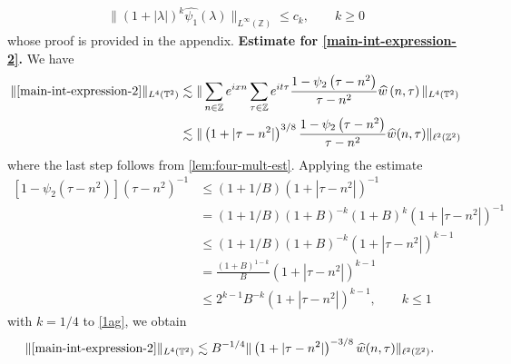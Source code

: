 \documentclass[12pt,reqno]{amsart}
\newcommand{\wh}{\widehat}
\newcommand{\zz}{\mathbb{Z}}
\newcommand{\ci}{\mathbb{T}}
\theoremstyle{plain}  %
\begin{document}
%
%
\begin{equation}
	\label{schwartz-bound}
	\begin{split}
		\|\left( 1 + |\lambda| \right)^k \wh{\psi_1}(\lambda) 
		\|_{L^\infty(\zz)} \le c_k , \qquad k\ge0
	\end{split}
\end{equation}
%
%
whose proof is provided in the appendix.
%
%
\vskip0.1in
%
%
%
%
%
%
\vskip0.1in
{\bf Estimate for \eqref{main-int-expression-2}.}
We have
%
%
\begin{equation}
	\label{1ag}
	\begin{split}
		\|\eqref{main-int-expression-2}\|_{L^4(\ci^2)} 
		& \lesssim \| \sum_{n \in \zz} e^{ixn} \sum_{\tau \in
		\zz} e^{it \tau} \frac{1- \psi_2\left( \tau - n^2 \right)}{\tau - 
		n^2} \wh{w}\left( n, \tau \right) \|_{L^4(\ci^2)}
		\\
		& \lesssim  \|\left( 1 + |\tau - n^2| \right)^{3/8}
		\frac{1- \psi_2\left( \tau - n^2 \right)}{\tau - 
		n^2} \wh{w}(n, \tau) \|_{\ell^2(\zz^2)}
	\end{split}
\end{equation}
%
%
where the last step follows from \autoref{lem:four-mult-est}. Applying the 
estimate
%
%
\begin{equation}
	\label{2ag}
	\begin{split}
		\left[ 1 - \psi_2\left( \tau - n^2 \right) \right]
		\left( \tau - n^2 \right)^{-1}
		& \le \left( 1 + 1 /B \right)\left( 1 + |\tau - n^2| 
		\right)^{-1}
		\\
		& = \left( 1 + 1/B \right)\left( 1 + B \right)^{-k }
		\left( 1 + B \right)^k \left( 1 + |\tau - n^2| \right)^{-1} 
				\\
		& \le \left( 1 + 1/B \right)\left( 1 + B \right)^{-k 
		} \left( 1 + |\tau - n^2| \right)^{k-1}
		\\
		& = \frac{\left( 1 + B \right)^{1-k }}{B} \left( 1 + |\tau - 
		n^2|
		\right)^{k - 1}
		\\
		& \le 2^{k -1} B^{-k } \left( 1 + |\tau - n^2| \right)^{k - 1}, 
		\qquad k \le 1
	\end{split}
\end{equation}
%
%
with $k = 1/4$ to \eqref{1ag}, we obtain 
%
%
\begin{equation}
	\label{3ag}
	\begin{split}
		\|\eqref{main-int-expression-2}\|_{L^4(\ci^2)}
		& \lesssim  
		B^{-1/4} \|\left( 1 + |\tau - n^2| \right)^{-3/8} \wh{w} (n, 
		\tau) \|_{\ell^2(\zz^2)}.
	\end{split}
\end{equation}
\end{document}
